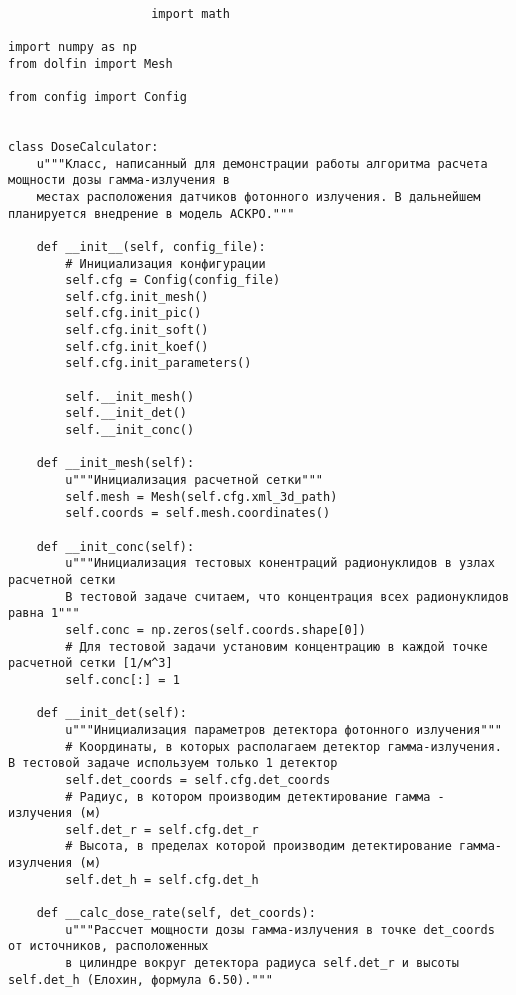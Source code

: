 \begin{lstlisting}[caption=Исходный код модуля расчета мощности эквивалентной дозы внешнего гамма-излучения, 
                    label={lst_dose_calc}, basicstyle=\scriptsize]

                    import math

import numpy as np
from dolfin import Mesh

from config import Config


class DoseCalculator:
    u"""Класс, написанный для демонстрации работы алгоритма расчета мощности дозы гамма-излучения в
    местах расположения датчиков фотонного излучения. В дальнейшем планируется внедрение в модель АСКРО."""

    def __init__(self, config_file):
        # Инициализация конфигурации
        self.cfg = Config(config_file)
        self.cfg.init_mesh()
        self.cfg.init_pic()
        self.cfg.init_soft()
        self.cfg.init_koef()
        self.cfg.init_parameters()

        self.__init_mesh()
        self.__init_det()
        self.__init_conc()

    def __init_mesh(self):
        u"""Инициализация расчетной сетки"""
        self.mesh = Mesh(self.cfg.xml_3d_path)
        self.coords = self.mesh.coordinates()

    def __init_conc(self):
        u"""Инициализация тестовых конентраций радионуклидов в узлах расчетной сетки
        В тестовой задаче считаем, что концентрация всех радионуклидов равна 1"""
        self.conc = np.zeros(self.coords.shape[0])
        # Для тестовой задачи установим концентрацию в каждой точке расчетной сетки [1/м^3]
        self.conc[:] = 1

    def __init_det(self):
        u"""Инициализация параметров детектора фотонного излучения"""
        # Координаты, в которых располагаем детектор гамма-излучения. В тестовой задаче используем только 1 детектор
        self.det_coords = self.cfg.det_coords
        # Радиус, в котором производим детектирование гамма - излучения (м)
        self.det_r = self.cfg.det_r
        # Высота, в пределах которой производим детектирование гамма-изулчения (м)
        self.det_h = self.cfg.det_h

    def __calc_dose_rate(self, det_coords):
        u"""Рассчет мощности дозы гамма-излучения в точке det_coords от источников, расположенных
        в цилиндре вокруг детектора радиуса self.det_r и высоты self.det_h (Елохин, формула 6.50)."""


\end{lstlisting}
